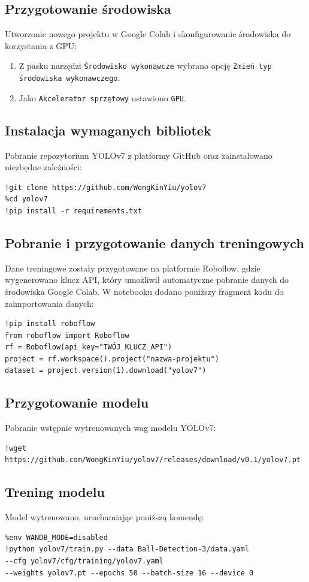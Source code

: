 \documentclass[a4paper,twoside,12pt]{book}
\begin{document}
\subsection{Przygotowanie środowiska}
Utworzonie nowego projektu w Google Colab i skonfigurowanie środowiska do korzystania z GPU:
\begin{enumerate}
    \item Z pasku narzędzi \texttt{Środowisko wykonawcze} wybrano opcję \texttt{Zmień typ środowiska wykonawczego}.
    \item Jako \texttt{Akcelerator sprzętowy} ustawiono \texttt{GPU}.
\end{enumerate}

\subsection{Instalacja wymaganych bibliotek}
Pobranie repozytorium YOLOv7 z platformy GitHub oraz zainstalowano niezbędne zależności:
\begin{verbatim}
!git clone https://github.com/WongKinYiu/yolov7
%cd yolov7
!pip install -r requirements.txt
\end{verbatim}

\subsection{Pobranie i przygotowanie danych treningowych}
Dane treningowe zostały przygotowane na platformie Roboflow, gdzie wygenerowano klucz API, który umożliwił automatyczne pobranie danych do środowiska Google Colab. W notebooku dodano poniższy fragment kodu do zaimportowania danych:
\begin{verbatim}
!pip install roboflow
from roboflow import Roboflow
rf = Roboflow(api_key="TWÓJ_KLUCZ_API")
project = rf.workspace().project("nazwa-projektu")
dataset = project.version(1).download("yolov7")
\end{verbatim}

\subsection{Przygotowanie modelu}
Pobranie wstępnie wytrenowanych wag modelu YOLOv7:
\begin{verbatim}
!wget https://github.com/WongKinYiu/yolov7/releases/download/v0.1/yolov7.pt
\end{verbatim}

\subsection{Trening modelu}
Model wytrenowano, uruchamiając poniższą komendę:
\begin{verbatim}
%env WANDB_MODE=disabled
!python yolov7/train.py --data Ball-Detection-3/data.yaml 
--cfg yolov7/cfg/training/yolov7.yaml 
--weights yolov7.pt --epochs 50 --batch-size 16 --device 0
\end{verbatim}
\end{document}
